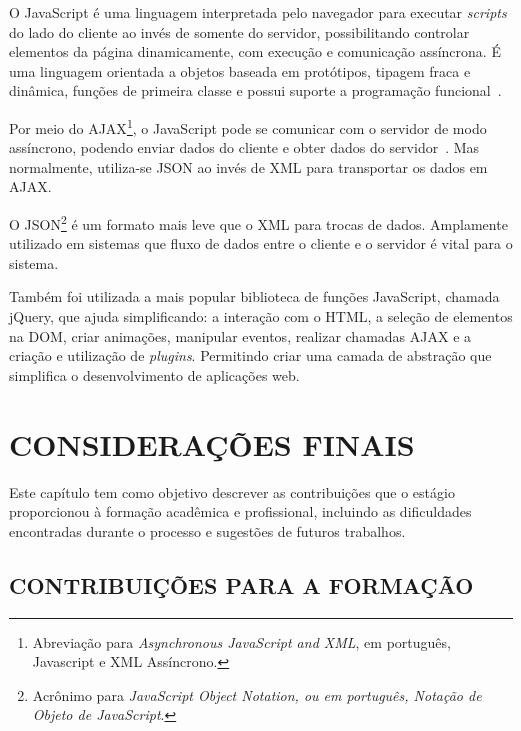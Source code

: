 \documentclass[
  12pt,				%
  openany,
  oneside,
  a4paper,			%
  english,			%
  brazil
]{article}
\numberwithin{figure}{section}
\numberwithin{table}{section}
\newcounter{subsubsubsection}[subsubsection]
\begin{document}



O JavaScript é uma linguagem interpretada pelo navegador para executar \textit{scripts} do lado do cliente ao invés de somente do servidor, possibilitando controlar elementos da página dinamicamente, com execução e comunicação assíncrona. É uma linguagem orientada a objetos baseada em protótipos, tipagem fraca e dinâmica, funções de primeira classe e possui suporte a programação funcional~\cite{PHP_Novatec_dev}.

Por meio do AJAX\footnote{Abreviação para \textit{Asynchronous JavaScript and XML}, em português, Javascript e XML Assíncrono.}, o JavaScript pode se comunicar com o servidor de modo assíncrono, podendo  enviar dados do cliente e obter dados do servidor~\cite{PHP_Novatec_ajax}. Mas normalmente, utiliza-se JSON ao invés de XML para transportar os dados em AJAX.

O JSON\footnote{Acrônimo para \textit{JavaScript Object Notation, ou em português, Notação de Objeto de JavaScript}.} é um formato mais leve que o XML para trocas de dados. Amplamente utilizado em sistemas que fluxo de dados entre o cliente e o servidor é vital para o sistema.

Também foi utilizada a mais popular biblioteca de funções JavaScript, chamada jQuery, que ajuda simplificando: a interação com o HTML, a seleção de elementos na DOM, criar animações, manipular eventos, realizar chamadas AJAX e a criação e utilização de \textit{plugins}. Permitindo criar uma camada de abstração que simplifica o desenvolvimento de aplicações web.




\clearpage
\section{CONSIDERAÇÕES FINAIS}


Este capítulo tem como objetivo descrever as contribuições que o estágio proporcionou à formação acadêmica e profissional, incluindo as dificuldades encontradas durante o processo e sugestões de futuros trabalhos.


\subsection{CONTRIBUIÇÕES PARA A FORMAÇÃO}
\end{document}
